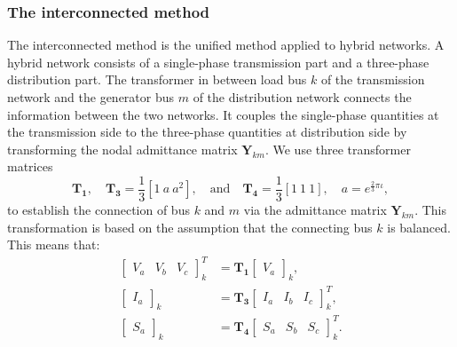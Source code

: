 \documentclass[10pt,journal]{article}
\begin{document}
\subsubsection{{The interconnected method}}
\label{sect:ic}
The interconnected method is the unified method applied to hybrid networks. A hybrid network consists of a single-phase transmission part and a three-phase distribution part. The transformer in between load bus $k$ of the transmission network and the generator bus $m$ of the distribution network connects the information between the two networks. It couples the single-phase quantities at the transmission side to the three-phase quantities at distribution side by transforming the nodal admittance matrix $\mathbf{Y}_{km}$. We use three transformer matrices  \begin{equation}
    \mathbf{T_1}, \quad \mathbf{T_3}  = \frac{1}{3}[1\ a\ a^2],\quad\mbox{and}\quad\mathbf{T_4}= \frac{1}{3}\left[1 \ 1 \ 1 \right],\quad a = e^{\frac{2}{3}\pi\iota},
   \label{eq:T1T2}\nonumber  %
\end{equation} to establish the connection of bus $k$ and $m$ via the admittance matrix $\mathbf{Y}_{km}$. This transformation is based on the assumption that the connecting bus $k$ is balanced. This means that:
\begin{align}
    \begin{bmatrix}V_a & V_b & V_c\end{bmatrix}^T_k &= \mathbf{T_1}\begin{bmatrix}V_a\end{bmatrix}_k,    \label{eq:VA+}
\\
    \begin{bmatrix}I_a\end{bmatrix}_k &= \mathbf{T_3}\begin{bmatrix}I_a & I_b & I_c\end{bmatrix}^T_k,
    \label{eq:IA+}\\
     \begin{bmatrix}S_a\end{bmatrix}_k &= \mathbf{T_4}\begin{bmatrix}S_a & S_b & S_c \end{bmatrix}^T_k.\label{eq:SA+}
\end{align}
\end{document}
